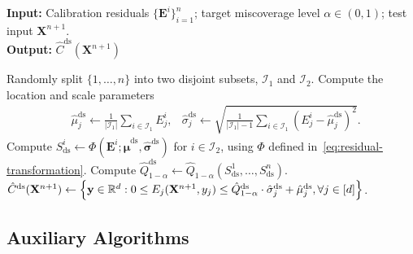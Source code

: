 \begin{algorithm}[!htb]
    \caption{Standardization with Data Splitting}
    \label{alg:std-ds}
    \textbf{Input:} Calibration residuals $\{\mathbf{E}^i\}_{i=1}^{n}$; target miscoverage level $\alpha\in(0,1)$; test input $\mathbf{X}^{n+1}$.\\
    \textbf{Output:} $\hat{C}^{\mathrm{ds}}(\mathbf{X}^{n+1})$
    \begin{algorithmic}[1]
        \State Randomly split $\{1,\ldots,n\}$ into two disjoint subsets, $\mathcal{I}_1$ and $\mathcal{I}_2$.
            \State Compute the location and scale parameters
            \begin{align*}
            & \hat{\mu}^{\mathrm{ds}}_j \gets \frac{1}{|\mathcal{I}_1|}\sum_{i \in \mathcal I_1}E^i_j,
              & \hat{\sigma}^{\mathrm{ds}}_j \gets \sqrt{\frac{1}{|\mathcal I_1|-1}\sum_{i \in \mathcal I_1}(E^i_j-\hat{\mu}^{\mathrm{ds}}_j)^2}.
            \end{align*}
        \EndFor
        \State Compute $S^i_{\mathrm{ds}} \gets \Phi(\mathbf{E}^i; \hat{\boldsymbol\mu}^{\mathrm{ds}},\hat{\boldsymbol\sigma}^{\mathrm{ds}})$ for $i \in \mathcal I_2$, using $\Phi$ defined in~\eqref{eq:residual-transformation}.
        \State Compute $\hat{Q}^\mathrm{ds}_{1-\alpha}\gets \hat{Q}_{1-\alpha}(S^1_\mathrm{ds},\dots, S^n_\mathrm{ds}).$
        \State \Return $\hat{C}^{\mathrm{ds}}(\mathbf{X}^{n+1}) \gets \left\{\mathbf y \in \mathbb{R}^d: 0 \leq E_j(\mathbf{X}^{n+1}, y_j) \leq \hat{Q}^\mathrm{ds}_{1-\alpha}\cdot \hat{\sigma}^\mathrm{ds}_j + \hat{\mu}^\mathrm{ds}_j, \forall j \in [d]\right\}$.
    \end{algorithmic}
\end{algorithm}

\FloatBarrier

\subsection{Auxiliary Algorithms}

